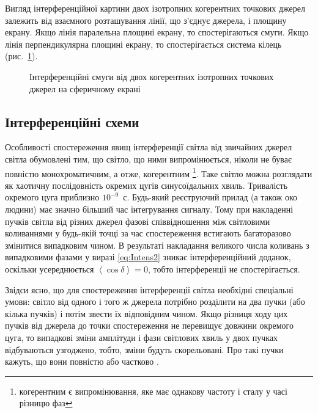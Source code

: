 Вигляд інтерференційної картини двох ізотропних когерентних точкових джерел залежить від взаємного розташування лінії, що з'єднує джерела, і площину екрану. Якщо лінія паралельна площині екрану, то спостерігаються смуги. Якщо лінія перпендикулярна площині екрану, то спостерігається система кілець (рис.~\ref{pic:3D_interference}).

\begin{figure}[h!]\centering
	
	\caption{Інтерференційні смуги від двох когерентних ізотропних точкових джерел на сферичному екрані}
	\label{pic:3D_interference}
\end{figure}



\subsection*{Інтерференційні схеми}


Особливості спостереження явищ інтерференції світла від звичайних джерел світла обумовлені тим, що світло, що ними випромінюється, ніколи не буває повністю монохроматичним, а отже, когерентним \footnote{когерентним є випромінювання, яке має однакову частоту і сталу у часі різницю фаз}. Таке світло можна розглядати як хаотичну послідовність окремих цугів синусоїдальних хвиль. Тривалість окремого цуга приблизно $10^{-9}$~с. Будь-який реєструючий прилад (а також око людини) має значно більший час інтегрування сигналу. Тому при накладенні пучків світла від різних джерел фазові співвідношення між світловими коливаннями у будь-якій точці за час спостереження встигають багаторазово змінитися випадковим чином. В результаті накладання великого числа коливань з випадковими фазами у виразі \eqref{eq:Intens2} зникає інтерференційний доданок, оскільки усереднюється $\left\langle \cos\delta \right\rangle = 0$, тобто інтерференції не спостерігається.

Звідси ясно, що для спостереження інтерференції світла необхідні спеціальні умови: світло від одного і того ж джерела потрібно розділити на два пучки (або кілька пучків) і потім звести їх відповідним чином. Якщо різниця ходу цих пучків від джерела до точки спостереження не перевищує довжини окремого цуга, то випадкові зміни амплітуди і фази світлових хвиль у двох пучках відбуваються узгоджено, тобто, зміни будуть скорельовані. Про такі пучки кажуть, що вони повністю або частково .

